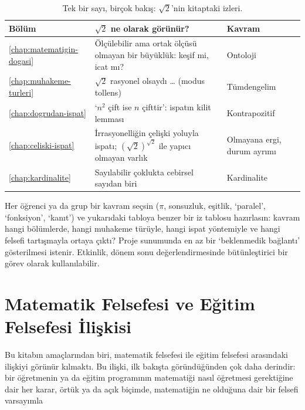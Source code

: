 \begin{table}[htbp]
\centering\small
\renewcommand{\arraystretch}{1.25}
\begin{tabularx}{\linewidth}{>{\raggedright\arraybackslash}p{1.35cm}>{\raggedright\arraybackslash}X>{\raggedright\arraybackslash}p{3.1cm}}
\toprule
\textbf{Bölüm} & \textbf{$\sqrt2$ ne olarak görünür?} & \textbf{Kavram}\\
\midrule
\ref{chap:matematigin-dogasi} & Ölçülebilir ama ortak ölçüsü olmayan bir büyüklük: keşif mi, icat mı? & Ontoloji\\
\ref{chap:muhakeme-turleri} & $\sqrt2$ rasyonel olsaydı … (modus tollens) & Tümdengelim\\
\ref{chap:dogrudan-ispat} & ‘$n^2$ çift ise $n$ çifttir’: ispatın kilit lemması & Kontrapozitif\\
\ref{chap:celiski-ispat} & İrrasyonelliğin çelişki yoluyla ispatı; $(\sqrt2)^{\sqrt2}$ ile yapıcı olmayan varlık & Olmayana ergi, durum ayrımı\\
\ref{chap:kardinalite} & Sayılabilir çoklukta cebirsel sayıdan biri & Kardinalite\\
\bottomrule
\end{tabularx}
\caption{Tek bir sayı, birçok bakış: $\sqrt2$’nin kitaptaki izleri.}
\end{table}

\begin{sinif}
Her öğrenci ya da grup bir kavram seçsin ($\pi$, sonsuzluk, eşitlik, ‘paralel’, ‘fonksiyon’, ‘kanıt’) ve yukarıdaki tabloya benzer bir iz tablosu hazırlasın: kavram hangi bölümlerde, hangi muhakeme türüyle, hangi ispat yöntemiyle ve hangi felsefi tartışmayla ortaya çıktı? Proje sunumunda en az bir ‘beklenmedik bağlantı’ gösterilmesi istenir. Etkinlik, dönem sonu değerlendirmesinde bütünleştirici bir görev olarak kullanılabilir.
\end{sinif}

\section{Matematik Felsefesi ve Eğitim Felsefesi İlişkisi}

Bu kitabın amaçlarından biri, matematik felsefesi ile eğitim felsefesi arasındaki ilişkiyi görünür kılmaktı. Bu ilişki, ilk bakışta göründüğünden çok daha derindir: bir öğretmenin ya da eğitim programının matematiği nasıl öğretmesi gerektiğine dair her karar, örtük ya da açık biçimde, matematiğin ne olduğuna dair bir felsefi varsayımla

